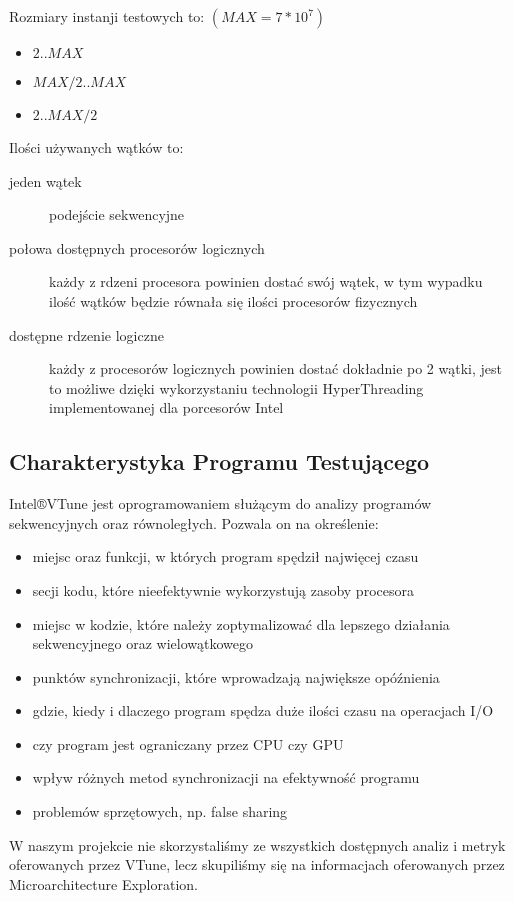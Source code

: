 \documentclass{article}
\begin{document}
                \noindent
                Rozmiary instanji testowych to: $(MAX = 7 * 10^7)$
                \begin{itemize}
                    \item $2 .. MAX$
                    \item $MAX / 2 .. MAX$
                    \item $2 .. MAX / 2$
                \end{itemize}
                
                \noindent
                Ilości używanych wątków to:
                \begin{description}
                    \item[jeden wątek] podejście sekwencyjne
                    \item[połowa dostępnych procesorów logicznych] każdy z rdzeni procesora powinien dostać swój wątek, w tym wypadku ilość wątków będzie równała się ilości procesorów fizycznych
                    \item[dostępne rdzenie logiczne] każdy z procesorów logicznych powinien dostać dokładnie po 2 wątki, jest to możliwe dzięki wykorzystaniu technologii HyperThreading implementowanej dla porcesorów Intel
                \end{description}
        
        \subsection{Charakterystyka Programu Testującego}
            Intel®VTune jest oprogramowaniem służącym do analizy programów sekwencyjnych oraz równoległych. Pozwala on na określenie:
            \begin{itemize}
                \item miejsc oraz funkcji, w których program spędził najwięcej czasu
                \item secji kodu, które nieefektywnie wykorzystują zasoby procesora
                \item miejsc w kodzie, które należy zoptymalizować dla lepszego działania sekwencyjnego oraz wielowątkowego
                \item punktów synchronizacji, które wprowadzają największe opóźnienia
                \item gdzie, kiedy i dlaczego program spędza duże ilości czasu na operacjach I/O
                \item czy program jest ograniczany przez CPU czy GPU
                \item wpływ różnych metod synchronizacji na efektywność programu
                \item problemów sprzętowych, np. false sharing
            \end{itemize}
            W naszym projekcie nie skorzystaliśmy ze wszystkich dostępnych analiz i metryk oferowanych przez VTune, lecz skupiliśmy się na informacjach oferowanych przez Microarchitecture Exploration.
        
\end{document}
